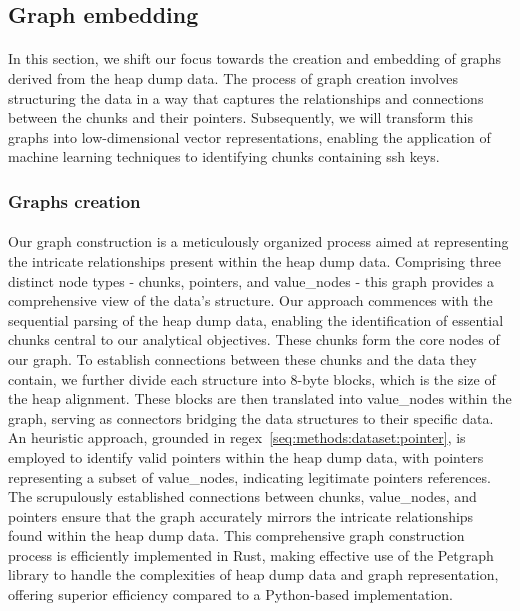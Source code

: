     

\subsection{Graph embedding}\label{sec:embedding:graph_embedding}
    \paragraph{}In this section, we shift our focus towards the creation and embedding of graphs derived from the heap dump data. The process of graph creation involves structuring the data in a way that captures the relationships and connections between the \glspl{chunk} and their \glspl{pointer}. Subsequently, we will transform this graphs into low-dimensional vector representations, enabling the application of machine learning techniques to identifying \glspl{chunk} containing ssh keys.

    \subsubsection{Graphs creation}
        \paragraph{}Our graph construction is a meticulously organized process aimed at representing the intricate relationships present within the heap dump data. Comprising three distinct node types - \glspl{chunk}, \glspl{pointer}, and \glspl{value_node} - this graph provides a comprehensive view of the data's structure. Our approach commences with the sequential parsing of the heap dump data, enabling the identification of essential \glspl{chunk} central to our analytical objectives. These \glspl{chunk} form the core nodes of our graph. To establish connections between these \glspl{chunk} and the data they contain, we further divide each structure into 8-byte blocks, which is the size of the heap alignment. These blocks are then translated into \glspl{value_node} within the graph, serving as connectors bridging the data structures to their specific data. An heuristic approach, grounded in \acrshort{regex}~\ref{seq:methods:dataset:pointer}, is employed to identify valid \glspl{pointer} within the heap dump data, with \glspl{pointer} representing a subset of \glspl{value_node}, indicating legitimate \glspl{pointer} references. The scrupulously established connections between \glspl{chunk}, \glspl{value_node}, and \glspl{pointer} ensure that the graph accurately mirrors the intricate relationships found within the heap dump data. This comprehensive graph construction process is efficiently implemented in Rust, making effective use of the Petgraph library to handle the complexities of heap dump data and graph representation, offering superior efficiency compared to a Python-based implementation.

